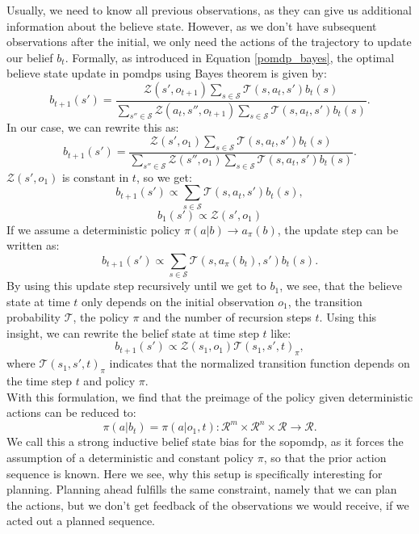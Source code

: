 Usually, 
we need to know all previous observations, as they can give us additional information about the believe state. However, as we don't have subsequent observations 
after the initial, we only need the actions of the trajectory to update our belief $b_t$. Formally, as introduced in Equation \ref{pomdp_bayes}, the optimal believe state 
update in \ac{pomdp}s using Bayes theorem is given by:
\begin{equation}
    b_{t+1}(s') = \frac{\mathcal{Z}(s', o_{t+1}) \sum_{s \in \mathcal{S}} \mathcal{T}(s, a_t, s') b_t(s)}{\sum_{s'' \in \mathcal{S}} \mathcal{Z}(a_t, s'', o_{t+1}) \sum_{s \in \mathcal{S}} \mathcal{T}(s, a_t, s') b_t(s)}.
\end{equation}
In our case, we can rewrite this as:
\begin{equation}
    b_{t+1}(s') = \frac{\mathcal{Z}(s', o_{1}) \sum_{s \in \mathcal{S}} \mathcal{T}(s, a_t, s') b_t(s)}{\sum_{s'' \in \mathcal{S}} \mathcal{Z}(s'', o_{1}) \sum_{s \in \mathcal{S}} \mathcal{T}(s, a_t, s') b_t(s)}.
\end{equation}
$\mathcal{Z}(s', o_{1})$ is constant in $t$, so we get:
\begin{equation*}
    b_{t+1}(s') \propto \sum_{s \in \mathcal{S}} \mathcal{T}(s, a_t, s') b_t(s),
\end{equation*}
\begin{equation}
    b_{1}(s') \propto \mathcal{Z}(s', o_{1})
\end{equation}
If we assume a deterministic policy $\pi(a|b) \rightarrow a_{\pi}(b)$, the update step can be written as:
\begin{equation}
    b_{t+1}(s') \propto \sum_{s \in \mathcal{S}} \mathcal{T}(s, a_{\pi}(b_t), s') b_t(s).
\end{equation}
By using this update step recursively until we get to $b_{1}$, we see, that the believe state at time $t$ only depends on the initial observation $o_1$,
the transition probability $\mathcal{T}$, the policy $\pi$ and the number of recursion steps $t$. Using this insight, we can rewrite the belief state at time step $t$ like:
\begin{equation}
    b_{t+1}(s') \propto \mathcal{Z}(s_1, o_{1}) \mathcal{T}(s_1, s', t)_{\pi},
\end{equation}
where $\mathcal{T}(s_1, s', t)_{\pi}$ indicates that the normalized transition function depends on the time step $t$ and policy $\pi$.\\
With this formulation, we find that the preimage of the policy given deterministic actions can be reduced to:
$$\pi(a|b_t) = \pi(a|o_1, t): \mathcal{R}^m \times \mathcal{R}^{n} \times \mathcal{R} \rightarrow \mathcal{R}.$$
We call this a strong inductive belief state bias for the \ac{sopomdp}, as it forces the assumption of a deterministic and constant policy $\pi$, so that the prior action sequence is known. 
Here we see, 
why this setup is specifically interesting for planning. Planning ahead fulfills the same constraint, namely that we can plan the actions, but we don't get feedback of the 
observations we would receive, if we acted out a planned sequence. \\

